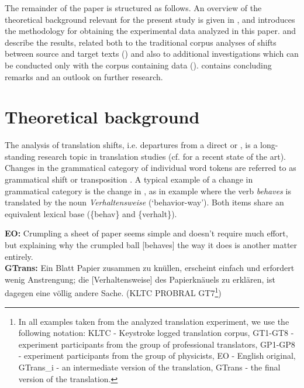 \documentclass[output=paper]{LSP/langsci}
\begin{document}
The remainder of the paper is structured as follows. An overview of the theoretical background relevant for the present study is given in , and  introduces the methodology for obtaining the experimental data analyzed in this paper.  and  describe the results, related both to the traditional corpus analyses of shifts between source and target texts () and also to additional investigations which can be conducted only with the corpus containing  data ().  contains concluding remarks and an outlook on further research. 

\section{Theoretical background}\label{serbinaetal:sec:2}
The analysis of translation shifts, i.e. departures from a direct or , is a long-standing research topic in translation studies (cf. \citet{Cyrus2009} for a recent state of the art). Changes in the grammatical category of individual word tokens are referred to as grammatical shift \citep{Catford1965} or transposition \citep{Vinay1995}. A typical example of a change in grammatical category is the change in , as in example  where the verb \textit{behaves} is translated by the noun \textit{Verhaltensweise} (`behavior-way'). Both items share an equivalent lexical base (\{behav\} and \{verhalt\}).

\ea\label{serbinaetal:ex:1}
\textbf{EO:} Crumpling a sheet of paper seems simple and doesn't require much effort, but explaining why the crumpled ball [behaves] the way it does is another matter entirely. \\
\textbf{GTrans:} Ein Blatt Papier zusammen zu knüllen, erscheint einfach und erfordert wenig Anstrengung; die [Verhaltensweise] des Papierknäuels zu erklären, ist dagegen eine völlig andere Sache. (KLTC PROBRAL GT7\footnote{In all examples taken from the analyzed translation experiment, we use the following notation: KLTC - Keystroke logged translation corpus, GT1-GT8 - experiment participants from the group of  professional translators, GP1-GP8 - experiment participants from the group of  physicists, EO - English original, GTrans\_i - an intermediate version of the  translation, GTrans - the final version of the  translation.})
\z
\end{document}
